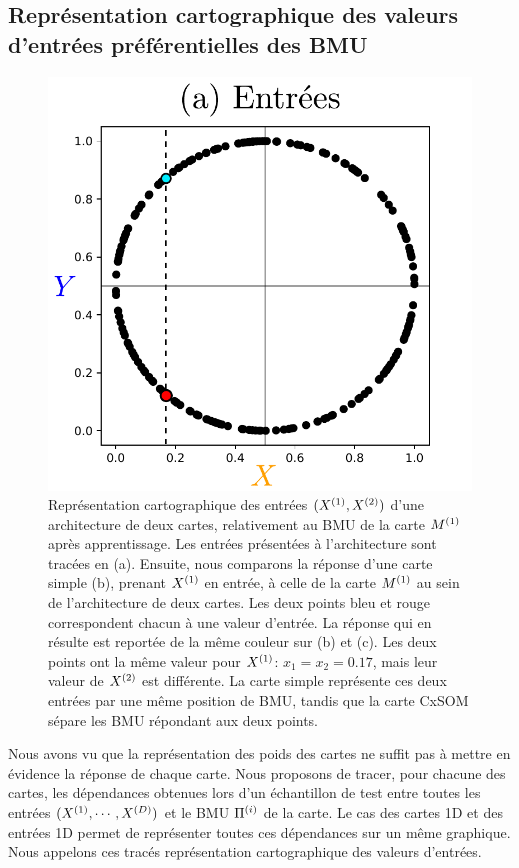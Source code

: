\documentclass[../main]{subfiles}
\begin{document}
\subsection{Représentation cartographique des valeurs d'entrées préférentielles des BMU}

\begin{figure}
    \includegraphics[width=\textwidth]{2som_inp_noU.pdf}
    \caption{Représentation cartographique des entrées $(X^{({1})},X^{({2})})$ d'une architecture de deux cartes, relativement au BMU de la carte $M^{({1})}$ après apprentissage. 
    Les entrées présentées à l'architecture sont tracées en (a). Ensuite, nous comparons la réponse d'une carte simple (b), prenant $X^{({1})}$ en entrée, à celle de la carte $M^{({1})}$ au sein de l'architecture de deux cartes.
    Les deux points bleu et rouge correspondent chacun à une valeur d'entrée. La réponse qui en résulte est reportée de la même couleur sur (b) et (c). Les deux points ont la même valeur pour $X^{({1})}$: $x_1 = x_2 = 0.17$, mais leur valeur de $X^{({2})}$ est différente. La carte simple représente ces deux entrées par une même position de BMU, tandis que la carte CxSOM sépare les BMU répondant aux deux points. \label{fig:inputs}}
    \end{figure}

Nous avons vu que la représentation des poids des cartes ne suffit pas à mettre en évidence la réponse de chaque carte. Nous proposons de tracer, pour chacune des cartes, les dépendances obtenues lors d'un échantillon de test entre toutes les entrées $(X^{({1})}, \cdots, X^{({D})})$ et le BMU $\Pi^{({i})}$ de la carte. Le cas des cartes 1D et des entrées 1D permet de représenter toutes ces dépendances sur un même graphique.
Nous appelons ces tracés représentation cartographique des valeurs d'entrées.
\end{document}
